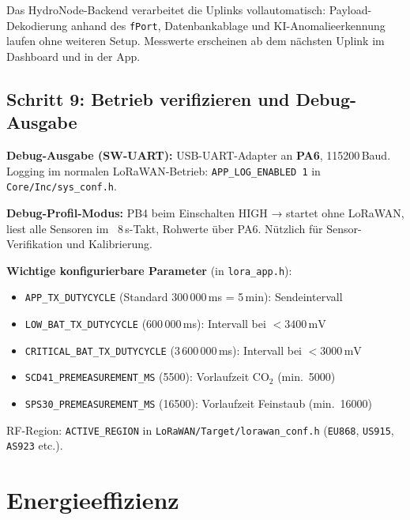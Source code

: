 \documentclass[11pt,a4paper]{scrartcl}
\begin{document}
Das HydroNode-Backend verarbeitet die Uplinks vollautomatisch: Payload-Dekodierung anhand des \texttt{fPort}, Datenbankablage und KI-Anomalieerkennung laufen ohne weiteren Setup. Messwerte erscheinen ab dem nächsten Uplink im Dashboard und in der App.

\subsection*{Schritt 9: Betrieb verifizieren und Debug-Ausgabe}

\textbf{Debug-Ausgabe (SW-UART):} USB-UART-Adapter an \textbf{PA6}, 115200\,Baud.
Logging im normalen LoRaWAN-Betrieb: \texttt{APP\_LOG\_ENABLED~1} in \texttt{Core/Inc/sys\_conf.h}.

\textbf{Debug-Profil-Modus:} PB4 beim Einschalten HIGH → startet ohne LoRaWAN, liest alle Sensoren im ~8\,s-Takt, Rohwerte über PA6. Nützlich für Sensor-Verifikation und Kalibrierung.

\textbf{Wichtige konfigurierbare Parameter} (in \texttt{lora\_app.h}):
\begin{itemize}
  \item \texttt{APP\_TX\_DUTYCYCLE} (Standard 300\,000\,ms = 5\,min): Sendeintervall
  \item \texttt{LOW\_BAT\_TX\_DUTYCYCLE} (600\,000\,ms): Intervall bei $<3400\,\text{mV}$
  \item \texttt{CRITICAL\_BAT\_TX\_DUTYCYCLE} (3\,600\,000\,ms): Intervall bei $<3000\,\text{mV}$
  \item \texttt{SCD41\_PREMEASUREMENT\_MS} (5500): Vorlaufzeit CO$_2$ (min.\ 5000)
  \item \texttt{SPS30\_PREMEASUREMENT\_MS} (16500): Vorlaufzeit Feinstaub (min.\ 16000)
\end{itemize}

RF-Region: \texttt{ACTIVE\_REGION} in \texttt{LoRaWAN/Target/lorawan\_conf.h} (\texttt{EU868}, \texttt{US915}, \texttt{AS923} etc.).

\section{Energieeffizienz}
\end{document}
